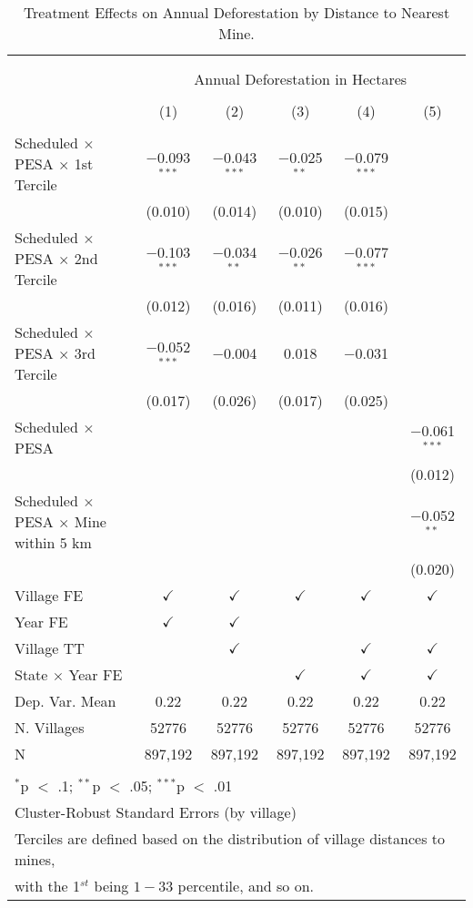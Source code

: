 
\begin{table}[!htbp] \footnotesize \centering 
  \caption{Treatment Effects on Annual Deforestation by Distance to Nearest Mine. } 
  \label{table:regresmine} 
\begin{tabular}{@{\extracolsep{0pt}}lccccc} 
\\[-1.8ex]\hline \\[-1.8ex] 
\\[-1.8ex] & \multicolumn{5}{c}{Annual Deforestation in Hectares} \\ 
\\[-1.8ex] & (1) & (2) & (3) & (4) & (5)\\ 
\hline \\[-1.8ex] 
 Scheduled $\times$ PESA $\times$ 1st Tercile & $-$0.093$^{***}$ & $-$0.043$^{***}$ & $-$0.025$^{**}$ & $-$0.079$^{***}$ &  \\ 
  & (0.010) & (0.014) & (0.010) & (0.015) &  \\ 
  Scheduled $\times$ PESA $\times$ 2nd Tercile & $-$0.103$^{***}$ & $-$0.034$^{**}$ & $-$0.026$^{**}$ & $-$0.077$^{***}$ &  \\ 
  & (0.012) & (0.016) & (0.011) & (0.016) &  \\ 
  Scheduled $\times$ PESA $\times$ 3rd Tercile & $-$0.052$^{***}$ & $-$0.004 & 0.018 & $-$0.031 &  \\ 
  & (0.017) & (0.026) & (0.017) & (0.025) &  \\ 
  Scheduled $\times$ PESA &  &  &  &  & $-$0.061$^{***}$ \\ 
  &  &  &  &  & (0.012) \\ 
  Scheduled $\times$ PESA $\times$ Mine within 5 km &  &  &  &  & $-$0.052$^{**}$ \\ 
  &  &  &  &  & (0.020) \\ 
 Village FE & $\checkmark$ & $\checkmark$ & $\checkmark$ & $\checkmark$ & $\checkmark$ \\ 
Year FE & $\checkmark$ & $\checkmark$ &  &  &  \\ 
Village TT &  & $\checkmark$ &  & $\checkmark$ & $\checkmark$ \\ 
State $\times$ Year FE &  &  & $\checkmark$ & $\checkmark$ & $\checkmark$ \\ 
Dep. Var. Mean & 0.22 & 0.22 & 0.22 & 0.22 & 0.22 \\ 
N. Villages & 52776 & 52776 & 52776 & 52776 & 52776 \\ 
N & 897,192 & 897,192 & 897,192 & 897,192 & 897,192 \\ 
\hline \\[-1.8ex] 
\multicolumn{6}{l}{$^{*}$p $<$ .1; $^{**}$p $<$ .05; $^{***}$p $<$ .01} \\ 
\multicolumn{6}{l}{Cluster-Robust Standard Errors (by village)} \\ 
\multicolumn{6}{l}{Terciles are defined based on the distribution of village distances to mines,} \\
\multicolumn{6}{l}{ with the 1$^{st}$ being $1-33$ percentile, and so on.}
\end{tabular} 
\end{table} 
